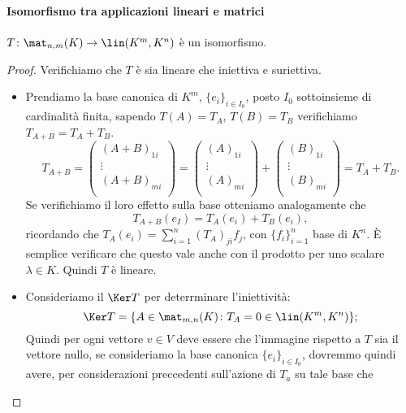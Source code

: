 \paragraph{Isomorfismo tra applicazioni lineari e matrici}
\begin{teorema} \label{t:isomorfismo-applicazioni-lineari-matrici}
	$T\colon\mat_{n,m}(K)\to \lin(K^m,K^n)$ è un isomorfismo.
\end{teorema}
\begin{proof}
	Verifichiamo che $T$ è sia lineare che iniettiva e suriettiva.
	\begin{itemize}
		\item Prendiamo la base canonica di $K^m$, $\{e_i\}_{i\in I_0}$, posto $I_0$ sottoinsieme di cardinalità finita, sapendo $T(A) = T_A$, $T(B) = T_B$ verifichiamo $T_{A+B} = T_A+T_B$. 
			\begin{equation*}
				T_{A+B} =
				\begin{pmatrix}
					(A+B)_{1i}\\
					\vdots\\
					(A+B)_{mi}\\
				\end{pmatrix}=
				\begin{pmatrix}
					(A)_{1i}\\
					\vdots\\
					(A)_{mi}\\
				\end{pmatrix}+
				\begin{pmatrix}
					(B)_{1i}\\
					\vdots\\
					(B)_{mi}\\
				\end{pmatrix}=
				T_A+T_B.
			\end{equation*}
			Se verifichiamo il loro effetto sulla base otteniamo analogamente che
			\begin{equation*}
				T_{A+B}(e_I) = T_A(e_i)+T_B(e_i),
			\end{equation*}
			ricordando che $T_{A}(e_i) = \sum_{i=1}^n (T_A)_{ji} f_j$, con $\{f_i\}_{i=1}^n$ base di $K^n$.
			È semplice verificare che questo vale anche con il prodotto per uno scalare $\lambda\in K$.
			Quindi $T$ è lineare.
		\item Consideriamo il $\Ker T$ per deterrminare l'iniettività:
			\begin{equation*}
				\Ker T = \{ A\in\mat_{m,n}(K)\colon T_A = 0\in \lin(K^m,K^n)\};
			\end{equation*}
			Quindi per ogni vettore $  v\in V$ deve essere che l'immagine rispetto a $T$ sia il vettore nullo, se consideriamo la base canonica $\{e_i\}_{i\in I_0}$, dovremmo quindi avere, per considerazioni preccedenti sull'azione di $T_a$ su tale base che

\end{itemize}
\end{proof}
